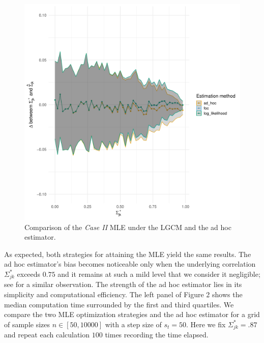 \begin{change}
    \begin{figure}\label{fig:case2_comparison}
        \includegraphics[width=\textwidth]{Figures/case_2_difference.pdf}
        \caption{Comparison of the \textit{Case II} MLE under the LGCM and the ad hoc estimator.}
    \end{figure}

    As expected, both strategies for attaining the MLE yield the same results. The ad hoc estimator's bias becomes noticeable only when the underlying correlation \(\Sigma^*_{jk}\) exceeds \(0.75\) and it remains at such a mild level that we consider it negligible; see \cite{Olsson82} for a similar observation. The strength of the ad hoc estimator lies in its simplicity and computational efficiency. The left panel of Figure 2 shows the median computation time surrounded by the first and third quartiles. We compare the two MLE optimization strategies and the ad hoc estimator for a grid of sample sizes \(n \in [50, 10000]\) with a step size of \(s_t = 50\). Here we fix \(\Sigma^*_{jk} = .87\) and repeat each calculation \(100\) times recording the time elapsed.


\end{change}
